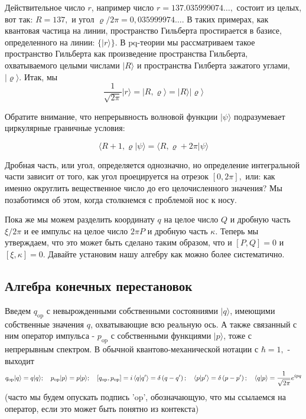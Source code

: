 \documentclass[main.tex]{subfiles}
\begin{document}
Действительное число $r$, например число $r=137.035999074\dots,$ состоит из целых, вот так: $R=137,$ и угол $\varrho / 2\pi=0,035999974\dots$. В таких примерах, как квантовая частица на линии, пространство Гильберта простирается в базисе, определенного на линии: $\{|r\rangle\}$. В  $\mathrm{pq}$-теории мы рассматриваем такое пространство Гильберта как произведение пространства Гильберта, охватываемого целыми числами $|R\rangle$ и пространства Гилберта зажатого углами,  $|\varrho\rangle .$ Итак, мы
\begin{equation}\label{16.1}
	\frac{1}{\sqrt{2 \pi}}|r\rangle=|R, \varrho\rangle=|R\rangle|\varrho\rangle
\end{equation}

Обратите внимание, что непрерывность волновой функции $|\psi\rangle$ подразумевает циркулярные граничные условия:

\begin{equation}\label{16.2}
	\langle R+1, \varrho | \psi\rangle=\langle R, \varrho+2 \pi | \psi\rangle
\end{equation}

Дробная часть, или угол, определяется однозначно, но определение интегральной части зависит от того, как угол проецируется на отрезок $[0,2 \pi],$ или: как именно округлить вещественное число до его целочисленного значения? Мы позаботимся об этом, когда столкнемся с проблемой нос к носу.

Пока же мы можем разделить координату $q$ на целое число $Q$ и дробную часть $\xi / 2 \pi$ и ее импульс на целое число $2 \pi P$ и дробную часть $\kappa .$ Теперь мы утверждаем, что это может быть сделано таким образом, что и $[P, Q]=0$ и $[\xi, \kappa]=0$.
Давайте установим нашу алгебру как можно более систематично.



\subsection{Алгебра конечных перестановок}\label{ch16.1}

Введем $q_{\mathrm{op}}$ с невырожденными собственными состояниями $|q\rangle$, имеющими собственные значения $q$, охватывающие всю реальную ось. А также связанный с ним оператор импульса - $p_{\mathrm{op}}$ с собственными функциями $|p\rangle$, тоже с непрерывным спектром. В обычной квантово-механической нотации с $\hbar=1,$ - выходит
\begin{equation}\label{16.3}
q_{\mathrm{op}}|q\rangle= q|q\rangle ; \quad p_{\mathrm{op}}|p\rangle= p|p\rangle ; \quad\left[q_{\mathrm{op}}, p_{\mathrm{op}}\right]=i
\\
\left\langle q | q^{\prime}\right\rangle=\delta\left(q-q^{\prime}\right) ; \quad\left\langle p | p^{\prime}\right\rangle=\delta\left(p-p^{\prime}\right) ; \quad\langle q | p\rangle=\frac{1}{\sqrt{2 \pi}} e^{i p q}
\end{equation}
(часто мы будем опускать подпись 'op', обозначающую, что мы ссылаемся на оператор, если это может  быть понятно из контекста)
\end{document}
